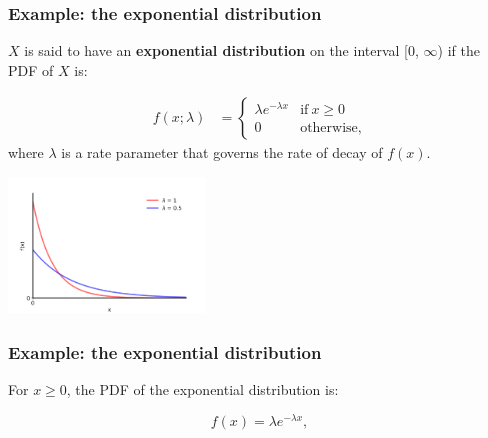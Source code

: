 \documentclass[10pt]{beamer}
\begin{document}
\begin{frame}
\frametitle{Example: the exponential distribution}

\begin{definition}
$X$ is said to have an \textbf{exponential distribution} on the interval [0, $\infty$) if the PDF of $X$ is:

\vspace{-.5cm}

\begin{align*}
    f(x; \lambda) &= 
    \begin{cases}
      \lambda e ^{-\lambda x} & \text{if}\ x \geq 0 \\
      0 & \text{otherwise},
    \end{cases}
\end{align*}
where $\lambda$ is a rate parameter that governs the rate of decay of $f(x)$. 
\end{definition}

\center \includegraphics[height=3.6cm]{images/exp_pdf.png}

\end{frame}

\begin{frame}
\frametitle{Example: the exponential distribution}

For $x \geq 0$, the PDF of the exponential distribution is:

\begin{equation*}
    f(x) = \lambda e ^{-\lambda x},
\end{equation*}




\end{frame}
\end{document}
